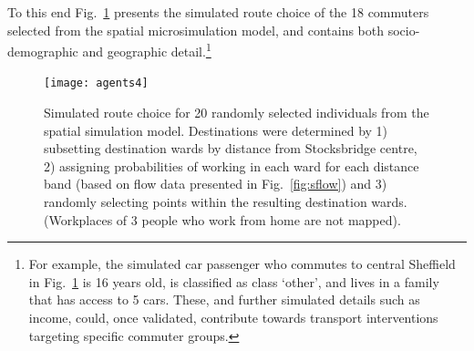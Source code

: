 To this
end Fig.~\ref{fig:agent} presents the simulated route choice of the 18
commuters selected from the spatial microsimulation model, and
contains both socio-demographic and geographic
detail.\footnote{For
example, the simulated car passenger who commutes to
central Sheffield in Fig.~\ref{fig:agent} is 16 years old, is classified as
class `other', and lives in a family that has access to 5 cars. These, and
further simulated details such as income, could, once validated, contribute
towards transport interventions targeting specific commuter groups.
}
\begin{figure}
 \texttt{[image: agents4]}
\caption[Simulated route choice for 20 randomly selected individuals]
{Simulated route choice for 20 randomly selected individuals
from the spatial simulation model. Destinations were determined by 1) subsetting
destination wards by distance from Stocksbridge centre, 2) assigning
probabilities of working in each ward for each distance band (based on flow
data presented in Fig.~\ref{fig:sflow}) and 3) randomly selecting points
within the resulting destination wards. (Workplaces of 3 people who work from
home are not mapped).}
\label{fig:agent}
\end{figure}

